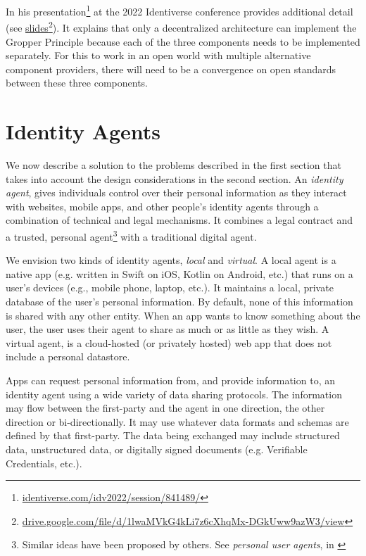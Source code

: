 \documentclass[11pt, oneside]{article}   	%
\newcommand{\hyperfootnote}[1][]{\def\ArgI{{#1}}\hyperfootnoteRelay}
\newcommand\hyperfootnoteRelay[2][]{\href{#1#2}{\ArgI}\footnote{\href{#1#2}{#2}}}
\begin{document}
In his presentation\hyperfootnote[][https://]{identiverse.com/idv2022/session/841489/} at the 2022 Identiverse conference provides additional detail (see \hyperfootnote[slides][https://]{drive.google.com/file/d/1lwaMVkG4kLi7z6cXhqMx-DGkUww9azW3/view}). It explains that only a decentralized architecture can implement the Gropper Principle because each of the three components needs to be implemented separately. For this to work in an open world with multiple alternative component providers, there will need to be a convergence on open standards between these three components. 

\section{Identity Agents} %

 We now describe a solution to the problems described in the first section that takes into account the design considerations in the second section. An \emph{identity agent}, gives individuals control over their personal information as they interact with websites, mobile apps, and other people's identity agents through a combination of technical and legal mechanisms. It combines a legal contract and a trusted, personal agent\footnote{Similar ideas have been proposed by others. See \emph{personal user agents}, in \cite[p24]{Flanagan2020}} with a traditional digital agent\cite{Graham2023}. 

We envision two kinds of identity agents, \emph{local} and \emph{virtual}. A local agent is a native app (e.g. written in Swift on iOS, Kotlin on Android, etc.) that runs on a user's devices (e.g., mobile phone, laptop, etc.). It maintains a local, private database of the user's personal information. By default, none of this information is shared with any other entity. When an app wants to know something about the user, the user uses their agent to share as much or as little as they wish. A virtual agent, is a cloud-hosted (or privately hosted) web app that does not include a personal datastore. 

Apps can request personal information from, and provide information to, an identity agent using a wide variety of data sharing protocols. The information may flow between the first-party and the agent in one direction, the other direction or bi-directionally. It may use whatever data formats and schemas are defined by that first-party. The data being exchanged may include structured data, unstructured data, or digitally signed documents (e.g. Verifiable Credentials, etc.). 

\end{document}
